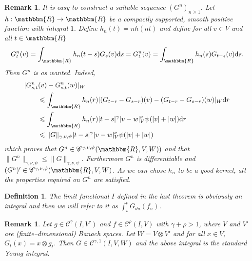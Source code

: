 \documentclass[a4paper,11pt]{article}
\newcommand{\mathd}{\mathrm{d}}
\newtheorem{definition}[theorem]{Definition}
\newtheorem{remark}[theorem]{Remark}
\newcommand{\CC}{\mathscr C}
\begin{document}
\begin{remark}
  It is easy to construct a suitable sequence $(G^{n} )_{n \ge 1}$. Let
  $h:\mathbbm{R} \to \mathbbm{R}$ be a compactly supported, smooth positive
  function with integral $1$. Define $h_{n} (t) =nh (nt)$ and define for all
  $v \in V$ and all $t \in \mathbbm{R}$
  \[ G_{t}^{n} (v) = \int_{\mathbbm{R}} h_{n}  (t-s) G_{s} (v) \mathd
     s=G_{t}^{n} (v) = \int_{\mathbbm{R}} h_{n} (s) G_{t-s} (v) \mathd s .\]
  Then $G^{n}$ is as wanted. Indeed,
  \begin{equation} \begin{split}
       & | G_{s,t}^{n} (v)-G_{s,t}^{n} (w) |_{W}\\
       & \hspace{2em} \leqslant \int_{\mathbbm{R}} h_{n} (r) | ( G_{t-r}
       -G_{s-r} ) (v)- ( G_{t-r} -G_{s-r} ) (w) |_{W} \mathd r\\
       & \hspace{2em} \leqslant \int_{\mathbbm{R}} h_{n} (r) | t-s |^{\gamma}
       |v-w|^{\nu}_{V} \psi ( | v | + | w | ) \mathd r\\
       & \hspace{2em} \leqslant \|G\|_{\gamma , \nu , \psi} |t-s|^{\gamma}
       |v-w|^{\nu}_{V}   \psi ( | v | + | w | )
     \end{split} \end{equation}
  which proves that $G^{n} \in \CC^{\gamma , \nu , \psi} (\mathbbm{R},V,W) )$
  and that $\|G^{n} \|_{\gamma , \nu , \psi} \leqslant \|G\|_{\gamma , \nu ,
  \psi}$. Furthermore $G^{n}$ is differentiable and $(G^{n} )' \in \CC^{\gamma ,
  \nu , \psi} (\mathbbm{R},V,W)$. As we can chose $h_{n}$ to be a good kernel,
  all the properties required on $G^{n}$ are satisfied.
\end{remark}

\begin{definition}
  The limit functional $I$ defined in the last theorem is obviously an
  integral and then we will refer to it as $\int_{s}^{t} G_{du} (f_{u} )$.
\end{definition}

\begin{remark}
  Let $g \in \CC^{\gamma} (I,V' )$ and $f \in \CC^{\rho} (I,V)$ with $\gamma +
  \rho >1$, where $V$ and $V'$ are (finite--dimensional) Banach spaces. Let
  $W=V \otimes V'$ and for all $x \in V$, $G_{t} (x) =x \otimes g_{t}$. Then
  $G \in \CC^{\gamma ,1} (I,V,W)$ and the above integral is the standard Young
  integral.
\end{remark}
\end{document}
